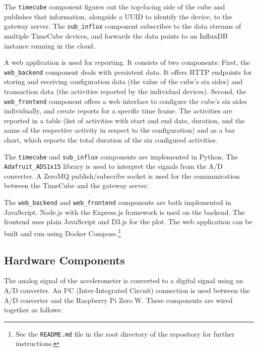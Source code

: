 The \texttt{timecube} component figures out the top-facing side of the cube and publishes that information, alongside a UUID to identify the device, to the gateway server. The \texttt{sub\_influx} component subscribes to the data streams of multiple TimeCube devices, and forwards the data points to an InfluxDB instance running in the cloud.

A web application is used for reporting. It consists of two components: First, the \texttt{web\_\-back\-end} component deals with persistent data. It offers HTTP endpoints for storing and receiving configuration data (the value of the cube's six sides) and transaction data (the activities reported by the individual devices). Second, the \texttt{web\_frontend} component offers a web interface to configure the cube's six sides individually, and create reports for a specific time frame. The activities are reported in a table (list of activities with start and end date, duration, and the name of the respective activity in respect to the configuration) and as a bar chart, which reports the total duration of the six configured activities.

The \texttt{timecube} and \texttt{sub\_influx} components are implemented in Python. The \texttt{Adafruit\_\-ADS1x15} library is used to interpret the signals from the A/D converter. A ZeroMQ publish/subscribe socket \cite[p. 245-247]{hintjens2013zeromq} is used for the communication between the TimeCube and the gateway server.

The \texttt{web\_backend} and \texttt{web\_frontend} components are both implemented in JavaScript. Node.js with the Express.js framework is used on the backend. The frontend uses plain JavaScript and D3.js for the plot. The web application can be built and run using Docker Compose.\footnote{See the \texttt{README.md} file in the root directory of the repository for further instructions.}

\subsection{Hardware Components}

The analog signal of the accelerometer is converted to a digital signal using an A/D converter. An I²C (Inter-Integrated Circuit) connection is used between the A/D converter and the Raspberry Pi Zero W. These components are wired together as follows:

